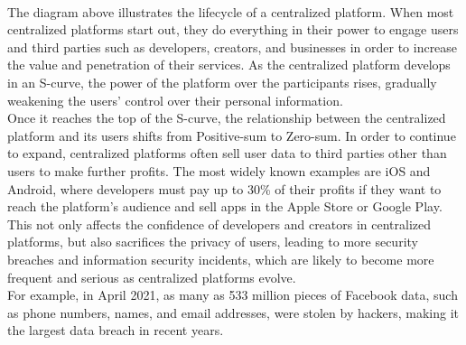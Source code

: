 \\
The diagram above illustrates the lifecycle of a centralized platform\cite{b35}. When most 
centralized platforms start out, they do everything in their power to engage users 
and third parties such as developers, creators, and businesses in order to increase 
the value and penetration of their services. As the centralized platform develops in 
an S-curve, the power of the platform over the participants rises, gradually weakening 
the users' control over their personal information\cite{b34}.
\\
Once it reaches the top of the S-curve, the relationship between the centralized 
platform and its users shifts from Positive-sum to Zero-sum\cite{b35, b17, b18}. In order to continue 
to expand, centralized platforms often sell user data to third parties other than 
users to make further profits. The most widely known examples are iOS and Android\cite{b34}, 
where developers must pay up to 30\% of their profits if they want to reach the 
platform's audience and sell apps in the Apple Store or Google Play\cite{b33}.
\\
This not only affects the confidence of developers and creators in centralized platforms, 
but also sacrifices the privacy of users, leading to more security breaches and 
information security incidents, which are likely to become more frequent and serious 
as centralized platforms evolve\cite{b34}.
\\
For example, in April 2021, as many as 533 million pieces of Facebook data, 
such as phone numbers, names, and email addresses, were stolen by hackers, making 
it the largest data breach in recent years\cite{b32}.